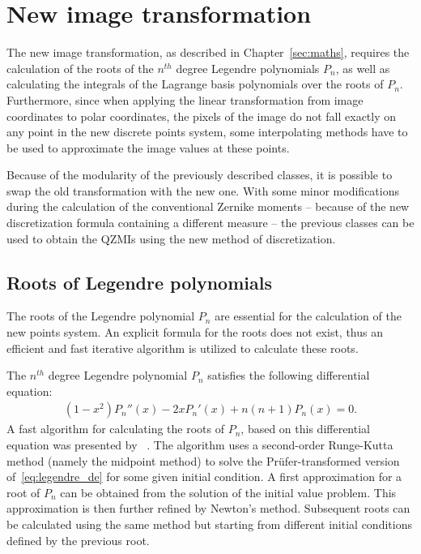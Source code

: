 \section{New image transformation}\label{sec:new_trans}
The new image transformation, as described in Chapter~\ref{sec:maths}, requires the calculation of the roots of the $n^{th}$ degree Legendre polynomials $P_n$, as well as calculating the integrals of the Lagrange basis polynomials over the roots of $P_n$. Furthermore, since when applying the linear transformation from image coordinates to polar coordinates, the pixels of the image do not fall exactly on any point in the new discrete points system, some interpolating methods have to be used to approximate the image values at these points.

Because of the modularity of the previously described classes, it is possible to swap the old transformation with the new one. With some minor modifications during the calculation of the conventional Zernike moments -- because of the new discretization formula containing a different measure -- the previous classes can be used to obtain the QZMIs using the new method of discretization.

\subsection{Roots of Legendre polynomials}
The roots of the Legendre polynomial $P_n$ are essential for the calculation of the new points system. An explicit formula for the roots does not exist, thus an efficient and fast iterative algorithm is utilized to calculate these roots.

The $n^{th}$ degree Legendre polynomial $P_n$ satisfies the following differential equation:
\begin{gather}
    (1-x^2)P_n''(x) - 2xP_n'(x) + n(n+1)P_n(x) = 0.\label{eq:legendre_de}
\end{gather}
A fast algorithm for calculating the roots of $P_n$, based on this differential equation was presented by \citeauthor{legendre_algo}~\cite{legendre_algo}. The algorithm uses a second-order Runge-Kutta method (namely the midpoint method) to solve the Prüfer-transformed version of~\eqref{eq:legendre_de} for some given initial condition. A first approximation for a root of $P_n$ can be obtained from the solution of the initial value problem. This approximation is then further refined by Newton's method.
Subsequent roots can be calculated using the same method but starting from different initial conditions defined by the previous root.


